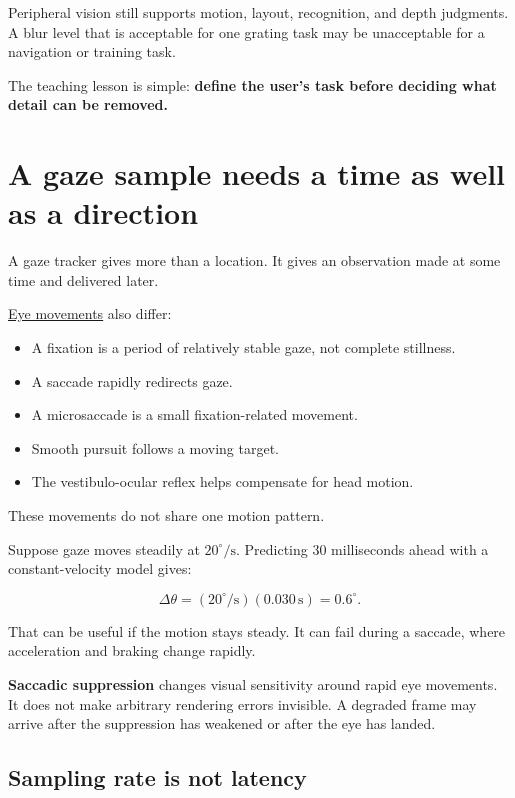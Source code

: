 Peripheral vision still supports motion, layout, recognition, and depth judgments. A blur level that is acceptable for one grating task may be unacceptable for a navigation or training task.

The teaching lesson is simple: \textbf{define the user's task before deciding what detail can be removed.}

\section{A gaze sample needs a time as well as a direction}\label{04-visual-computing-ii-ch043-a-gaze-sample-needs-a-time-as-well-as-a-direction}

A gaze tracker gives more than a location. It gives an observation made at some time and delivered later.

\hyperref[appendix-a6f2c4fe1996]{Eye movements} also differ:

\begin{itemize}
\tightlist
\item
  A fixation is a period of relatively stable gaze, not complete stillness.
\item
  A saccade rapidly redirects gaze.
\item
  A microsaccade is a small fixation-related movement.
\item
  Smooth pursuit follows a moving target.
\item
  The vestibulo-ocular reflex helps compensate for head motion.
\end{itemize}

These movements do not share one motion pattern.

Suppose gaze moves steadily at \(20^\circ/\mathrm{s}\). Predicting 30 milliseconds ahead with a constant-velocity model gives:

\[
\Delta\theta
=(20^\circ/\mathrm{s})(0.030\,\mathrm{s})
=0.6^\circ.
\]

That can be useful if the motion stays steady. It can fail during a saccade, where acceleration and braking change rapidly.

\textbf{Saccadic suppression} changes visual sensitivity around rapid eye movements. It does not make arbitrary rendering errors invisible. A degraded frame may arrive after the suppression has weakened or after the eye has landed.

\subsection{Sampling rate is not latency}\label{04-visual-computing-ii-ch043-sampling-rate-is-not-latency}

